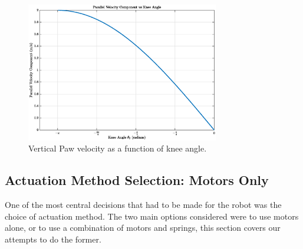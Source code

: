 \begin{figure}[h]
    \centering
    \includegraphics[width=0.75\textwidth]{Images/vertical_jacobian_velocity.eps}
    \caption{Vertical Paw velocity as a function of knee angle.}
    \label{fig:vertical_jacobian_velocity}
\end{figure}

\subsection{Actuation Method Selection: Motors Only}

One of the most central decisions that had to be made for the robot was the choice of actuation method. The two main options considered were to use motors alone, or to use a combination of motors and springs, this section covers our attempts to do the former. 

